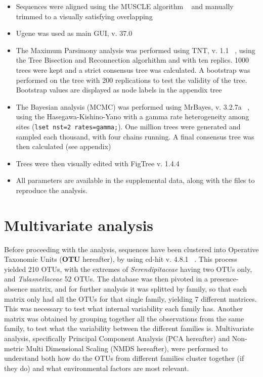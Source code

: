 \begin{itemize}
\item Sequences were aligned using the MUSCLE algorithm ~\citep{edgar2004} and manually trimmed to a visually satisfying overlapping

\item Ugene was used as main GUI, v. 37.0 ~\citep{okonechnikov2012}

\item The Maximum Parsimony analysis was performed using TNT, v. 1.1 ~\citep{tnt}, using the Tree Bisection and Reconnection algorhithm and with ten replics. 1000 trees were kept and a strict consensus tree was calculated. A bootstrap was performed on the tree with 200 replications to test the validity of the tree. Bootstrap values are displayed as node labels in the appendix tree

\item The Bayesian analysis (MCMC) was performed using MrBayes, v. 3.2.7a ~\citep{huelsenbeck2001}, using the Hasegawa-Kishino-Yano with a gamma rate heterogeneity among sites (\texttt{lset nst=2 rates=gamma;}). One million trees were generated and sampled each thousand, with four chains running. A final consensus tree was then calculated (see appendix)

\item Trees were then visually edited with FigTree v. 1.4.4

\item All parameters are available in the supplemental data, along with the files to reproduce the analysis.

\end{itemize}

\chapter{Multivariate analysis}
\label{multivariateanalysis}

Before proceeding with the analysis, sequences have been clustered into Operative Taxonomic Units (\textbf{OTU} hereafter), by using cd-hit v. 4.8.1 ~\citep{li2001}. This process yielded 210 OTUs, with the extremes of \emph{Serendipitaceae} having two OTUs only, and \emph{Tulasnellaceae} 52 OTUs. The database was then pivoted in a presence-absence matrix, and for further analysis it was splitted by family, so that each matrix only had all the OTUs for that single family, yielding 7 different matrices. This was necessary to test what internal variability each family has. Another matrix was obtained by grouping together all the observations from the same family, to test what the variability between the different families is. Multivariate analysis, specifically Principal Component Analysis (PCA hereafter) and Non-metric Multi Dimensional Scaling (NMDS hereafter), were performed to understand both how do the OTUs from different families cluster together (if they do) and what environmental factors are most relevant.

